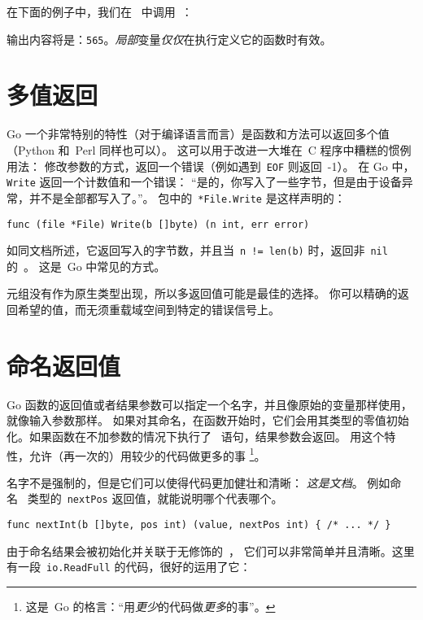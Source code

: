 在下面的例子中，我们在~ 中调用~：



输出内容将是：\texttt{565}。\emph{局部}变量\emph{仅仅}在执行定义它的函数时有效。

\section{多值返回}
\label{sec:multiple return}
Go 一个非常特别的特性（对于编译语言而言）是函数和方法可以返回多个值（Python 和~Perl 同样也可以）。
这可以用于改进一大堆在~C 程序中糟糕的惯例用法：
修改参数的方式，返回一个错误（例如遇到~\texttt{EOF} 则返回~-1）。
在 Go 中，\lstinline{Write} 返回一个计数值和一个错误：
``是的，你写入了一些字节，但是由于设备异常，并不是全部都写入了。''。
 包中的~\lstinline{*File.Write} 是这样声明的：
\begin{lstlisting}
func (file *File) Write(b []byte) (n int, err error)
\end{lstlisting}
如同文档所述，它返回写入的字节数，并且当~\lstinline{n != len(b)} 时，返回非~\lstinline{nil} 的~。
这是~Go 中常见的方式。

元组没有作为原生类型出现，所以多返回值可能是最佳的选择。
你可以精确的返回希望的值，而无须重载域空间到特定的错误信号上。

\section{命名返回值}
\label{sec:named result parameters}
Go 函数的返回值或者结果参数可以指定一个名字，并且像原始的变量那样使用，就像输入参数那样。
如果对其命名，在函数开始时，它们会用其类型的零值初始化。如果函数在不加参数的情况下执行了~
 语句，结果参数会返回。
用这个特性，允许（再一次的）用较少的代码做更多的事
\footnote{这是~Go 的格言：``用\emph{更少}的代码做\emph{更多}的事''。}。

名字不是强制的，但是它们可以使得代码更加健壮和清晰：
\emph{这是文档}。
例如命名~ 类型的~\lstinline{nextPos} 返回值，就能说明哪个代表哪个。

\begin{lstlisting}
func nextInt(b []byte, pos int) (value, nextPos int) { /* ... */ }
\end{lstlisting}
由于命名结果会被初始化并关联于无修饰的~，
它们可以非常简单并且清晰。这里有一段~\lstinline{io.ReadFull} 的代码，很好的运用了它：


